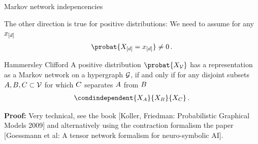\documentclass{beamer}
\begin{document}
    \begin{frame}{Markov network indepencencies}

        The other direction is true for positive distributions: We need to assume for any $x_{[d]}$
        \begin{align*}
            \probat{\indexedshortcatvariables}\neq 0 \, .
        \end{align*}

        \begin{theorem}{Hammersley Clifford}
            A positive distribution $\probat{\nodevariables}$ has a representation as a Markov network on a hypergraph $\mathcal{G}$, if and only if for any disjoint subsets $A,B,C\subset\mathcal{V}$ for which $C$ separates $A$ from $B$
            \begin{align*}
                \condindependent{\catvariableof{\nodesa}}{\catvariableof{\nodesb}}{\catvariableof{\nodesc}} \, .
            \end{align*}
        \end{theorem}
            {\bf Proof:} Very technical, see the book [Koller, Friedman: Probabilistic Graphical Models 2009] and alternatively using the contraction formalism the paper [Goessmann et al: A tensor network formalism for neuro-symbolic AI].
    \end{frame}
\end{document}
